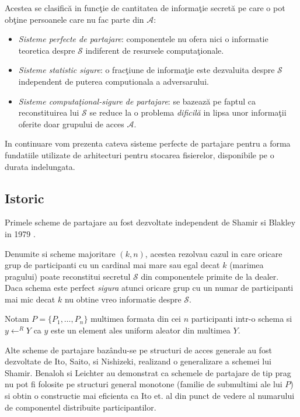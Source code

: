 \documentclass{llncs}
\newcommand{\todo}[1]{{\color{red}{TODO #1}}}
\begin{document}
Acestea se clasific\u{a} in func\c{t}ie de cantitatea de informa\c{t}ie secret\u{a} pe care o pot ob\c{t}ine persoanele care nu fac parte din $\mathcal{A}$:
\begin{itemize}
	\item \textit{Sisteme perfecte de partajare}: componentele nu ofera nici o informatie teoretica despre $\mathcal{S}$ indiferent de resursele computa\c{t}ionale.
	\item \textit{Sisteme statistic sigure}: o frac\c{t}iune de informa\c{t}ie este dezvaluita despre $\mathcal{S}$ independent de puterea computionala a adversarului.
	\item \textit{Sisteme computa\c{t}ional-sigure de partajare}: se bazeaz\u{a} pe faptul ca reconstituirea lui $\mathcal{S}$ se reduce la o problema \textit{dificil\u{a}}\cite{boneh:1998-decision} in lipsa unor informa\c{t}ii oferite doar grupului de acces $\mathcal{A}$.
\end{itemize} 

In continuare vom prezenta cateva sisteme perfecte de partajare pentru a forma fundatiile utilizate de arhitecturi pentru stocarea fisierelor, disponibile pe o durata indelungata.

\subsection{Istoric}

Primele scheme de partajare au fost dezvoltate independent de Shamir si Blakley in 1979 \cite{B:1979, S:1979}.

Denumite si scheme majoritare $(k, n)$, acestea rezolvau cazul in care oricare grup de participanti cu un cardinal mai mare sau egal decat $k$  (marimea pragului) poate reconstitui secretul $\mathcal{S}$ din componentele primite de la dealer. Daca schema este perfect \textit{sigura} atunci oricare grup cu un numar de participanti mai mic decat $k$ nu obtine vreo informatie despre $\mathcal{S}$.

Notam $P = \{P_1, \dots, P_n\}$ multimea formata din cei $n$ participanti intr-o schema si $y \leftarrow^R Y$ ca $y$ este un element ales uniform aleator din multimea $Y$.

Alte scheme de partajare baz\^{a}ndu-se pe structuri de acces generale au fost dezvoltate de Ito, Saito, si Nishizeki, realizand o generalizare a schemei lui Shamir. \cite{ITO:1989}
Benaloh si Leichter au demonstrat ca schemele de partajare de tip prag nu pot fi folosite pe structuri general monotone (familie de submultimi ale lui $P$) si obtin o constructie mai eficienta ca Ito et. al \cite{ITO:1989} din punct de vedere al numarului de componentel distribuite participantilor. \cite{JJ:1990}
\end{document}

